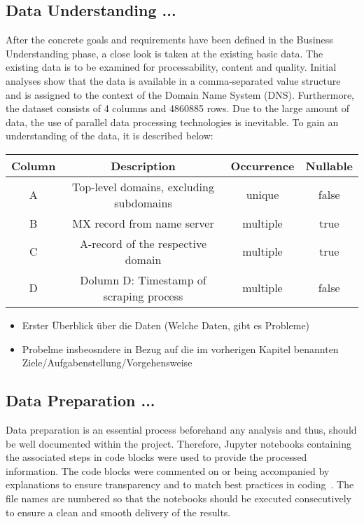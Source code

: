 \subsection{Data Understanding ...}\label{subsec:dataunderstanding}
After the concrete goals and requirements have been defined in the Business Understanding phase, a close look is taken at the existing basic data.
The existing data is to be examined for processability, content and quality.
Initial analyses show that the data is available in a comma-separated value structure and is assigned to the context of the Domain Name System (DNS).
Furthermore, the dataset consists of 4 columns and 4860885 rows.
Due to the large amount of data, the use of parallel data processing technologies is inevitable.
To gain an understanding of the data, it is described below:

\begin{center}
    \begin{tabular}{||c c c c||} 
    \hline
    Column & Description & Occurrence & Nullable \\ [0.5ex] 
    \hline\hline
    A & Top-level domains, excluding subdomains & unique & false \\ 
    \hline
    B & MX record from name server & multiple & true \\
    \hline
    C & A-record of the respective domain & multiple & true \\
    \hline
    D & Dolumn D: Timestamp of scraping process & multiple & false
   \end{tabular}
   \end{center}

\begin{itemize}
    \item Erster Überblick über die Daten (Welche Daten, gibt es Probleme)
    \item Probelme insbeosndere in Bezug auf die im vorherigen Kapitel benannten Ziele/Aufgabenstellung/Vorgehensweise
\end{itemize}

\subsection{Data Preparation ...}\label{subsec:datapreparation}
Data preparation is an essential process beforehand any analysis and thus, should be well documented within the project.
Therefore, Jupyter notebooks containing the associated steps in code blocks were used to provide the processed information.
The code blocks were commented on or being accompanied by explanations to ensure transparency and to match best practices in coding~\autocite[cf.][]{Kosourova.2021}.
The file names are numbered so that the notebooks should be executed consecutively to ensure a clean and smooth delivery of the results.

